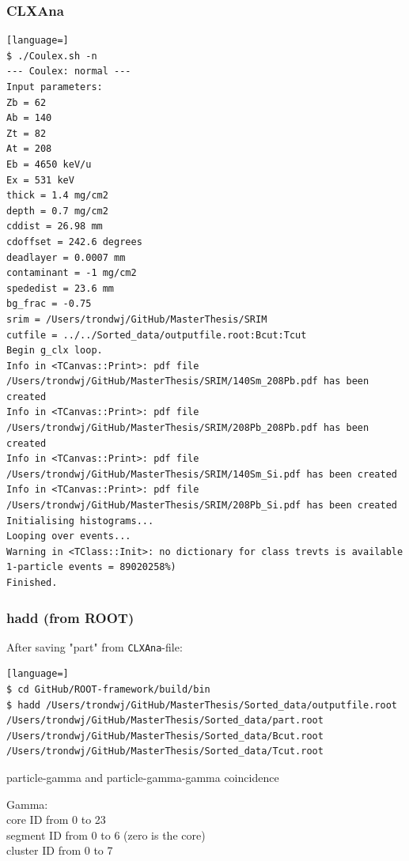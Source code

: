 \documentclass[twoside,english]{uiofysmaster/uiofysmaster}
\begin{document}
\subsubsection{CLXAna}
\begin{lstlisting}[language=]
$ ./Coulex.sh -n
--- Coulex: normal ---
Input parameters:
Zb = 62
Ab = 140
Zt = 82
At = 208
Eb = 4650 keV/u
Ex = 531 keV
thick = 1.4 mg/cm2
depth = 0.7 mg/cm2
cddist = 26.98 mm
cdoffset = 242.6 degrees
deadlayer = 0.0007 mm
contaminant = -1 mg/cm2
spededist = 23.6 mm
bg_frac = -0.75
srim = /Users/trondwj/GitHub/MasterThesis/SRIM
cutfile = ../../Sorted_data/outputfile.root:Bcut:Tcut
Begin g_clx loop.
Info in <TCanvas::Print>: pdf file /Users/trondwj/GitHub/MasterThesis/SRIM/140Sm_208Pb.pdf has been created
Info in <TCanvas::Print>: pdf file /Users/trondwj/GitHub/MasterThesis/SRIM/208Pb_208Pb.pdf has been created
Info in <TCanvas::Print>: pdf file /Users/trondwj/GitHub/MasterThesis/SRIM/140Sm_Si.pdf has been created
Info in <TCanvas::Print>: pdf file /Users/trondwj/GitHub/MasterThesis/SRIM/208Pb_Si.pdf has been created
Initialising histograms...
Looping over events...
Warning in <TClass::Init>: no dictionary for class trevts is available
1-particle events = 89020258%)    
Finished.
\end{lstlisting}


\subsubsection{hadd (from ROOT)}
After saving "part" from \texttt{CLXAna}-file:
\begin{lstlisting}[language=]
$ cd GitHub/ROOT-framework/build/bin
$ hadd /Users/trondwj/GitHub/MasterThesis/Sorted_data/outputfile.root /Users/trondwj/GitHub/MasterThesis/Sorted_data/part.root /Users/trondwj/GitHub/MasterThesis/Sorted_data/Bcut.root /Users/trondwj/GitHub/MasterThesis/Sorted_data/Tcut.root 
\end{lstlisting}



\bigskip

particle-gamma and particle-gamma-gamma coincidence

\bigskip

Gamma: \\
core ID from 0 to 23 \\
segment ID from 0 to 6 (zero is the core) \\
cluster ID from 0 to 7 \\

\bigskip
\end{document}
